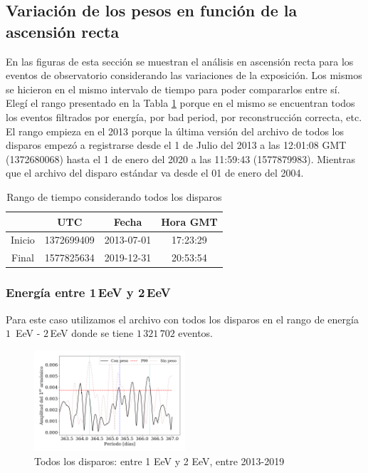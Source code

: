 \subsection{Variación de los pesos en función de la ascensión recta}
En las figuras de esta sección se muestran el análisis en ascensión recta para los eventos de observatorio considerando las variaciones de la exposición. 
Los mismos se hicieron en el mismo intervalo de tiempo para poder compararlos entre sí. Elegí el rango presentado en la Tabla \ref{rango_corto}  porque en el mismo se encuentran todos los eventos filtrados por energía, por bad period, por reconstrucción correcta, etc. El rango empieza en el 2013 porque la última versión del archivo de todos los disparos empezó a registrarse desde el  1 de Julio del 2013 a las 12:01:08 GMT (1372680068) hasta el  1 de enero del 2020 a las 11:59:43 (1577879983). Mientras que el archivo del disparo estándar va desde el 01 de enero del 2004.

	\begin{table}[H]
	\centering
		\begin{tabular}{c|c|c|c}
	 		& UTC 			& Fecha		 	&  Hora GMT  \\ \hline
	Inicio	& 1372699409	&2013-07-01 	&17:23:29		\\
	Final 	& 1577825634	&2019-12-31 	&20:53:54		\\
		\end{tabular}
	\caption{Rango de tiempo considerando todos los disparos} 	\label{rango_corto}
	\end{table}


\subsubsection{Energía entre 1\,EeV y 2\,EeV}

Para este caso utilizamos el archivo con todos los disparos en el rango de energía $1\,$ EeV - $2\,$EeV donde se tiene $1\,321\,702$ eventos.

\begin{figure}[H]
	\centering
	\includegraphics[width=0.5\textwidth]{2019_AllTriggers_1_2_EeV_con_vs_sin_peso.png}
	\caption{Todos los disparos: entre 1 EeV y 2 EeV, entre 2013-2019}
	\label{fig:12w}
\end{figure}

